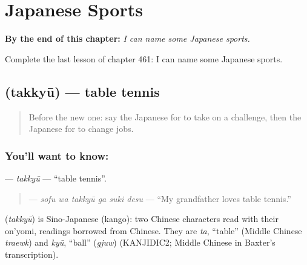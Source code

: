 
\chapter{Japanese Sports}
\label{ch:ja-japanese-sports}

\begin{chapteropening}
\textbf{By the end of this chapter:} \emph{I can name some Japanese sports.}

Complete the last lesson of chapter 461: I can name some Japanese sports.
\end{chapteropening}

\section[\texorpdfstring{\ja{たっきゅう} (takkyū)}{たっきゅう (takkyū)}]{ (takkyū) — table tennis}

\label{lesson:JA-C461-takkyuu}



\begin{quote}
Before the new one: say the Japanese for to take on a challenge, then the Japanese for to change jobs.
\end{quote}

\subsection*{You'll want to know: }
\textbf{} — \emph{takkyū} — \textquotedblleft{}table tennis\textquotedblright{}.

\begin{quote}
\textbf{  } — \emph{sofu wa takkyū ga suki desu} — \textquotedblleft{}My grandfather loves table tennis.\textquotedblright{}
\end{quote}

\begin{cousinweb}
\textbf{} (\emph{takkyū}) is Sino-Japanese (kango): two Chinese characters read with their on'yomi, readings borrowed from Chinese. They are \emph{ta}, \textquotedblleft{}table\textquotedblright{} (Middle Chinese \emph{traewk}) and \emph{kyū}, \textquotedblleft{}ball\textquotedblright{} (\emph{gjuw}) (KANJIDIC2; Middle Chinese in Baxter's transcription).
\end{cousinweb}

